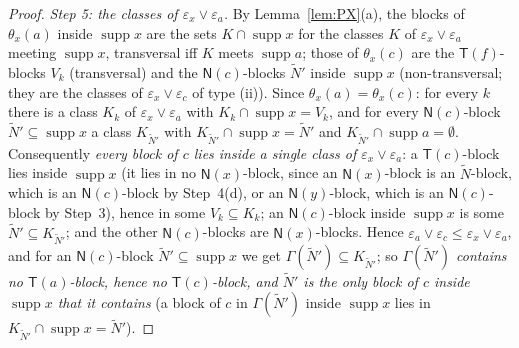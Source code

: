 \documentclass[11pt]{amsart}
\theoremstyle{definition}
\newcommand{\supp}{\operatorname{supp}}
\newcommand{\T}{\mathsf{T}}
\newcommand{\N}{\mathsf{N}}
\begin{document}
\begin{proof}
\emph{Step 5: the classes of $\varepsilon_x\vee\varepsilon_a$.} By Lemma~\ref{lem:PX}(a), the blocks of $\theta_x(a)$ inside $\supp x$ are the sets $K\cap\supp x$ for the classes $K$ of $\varepsilon_x\vee\varepsilon_a$ meeting $\supp x$, transversal iff $K$ meets $\supp a$; those of $\theta_x(c)$ are the $\T(f)$-blocks $V_k$ (transversal) and the $\N(c)$-blocks $\tilde N'$ inside $\supp x$ (non-transversal; they are the classes of $\varepsilon_x\vee\varepsilon_c$ of type (ii)). Since $\theta_x(a)=\theta_x(c)$: for every $k$ there is a class $K_k$ of $\varepsilon_x\vee\varepsilon_a$ with $K_k\cap\supp x=V_k$, and for every $\N(c)$-block $\tilde N'\subseteq\supp x$ a class $K_{\tilde N'}$ with $K_{\tilde N'}\cap\supp x=\tilde N'$ and $K_{\tilde N'}\cap\supp a=\emptyset$. Consequently \emph{every block of $c$ lies inside a single class of $\varepsilon_x\vee\varepsilon_a$}: a $\T(c)$-block lies inside $\supp x$ (it lies in no $\N(x)$-block, since an $\N(x)$-block is an $\tilde N$-block, which is an $\N(c)$-block by Step~4(d), or an $\N(y)$-block, which is an $\N(c)$-block by Step~3), hence in some $V_k\subseteq K_k$; an $\N(c)$-block inside $\supp x$ is some $\tilde N'\subseteq K_{\tilde N'}$; and the other $\N(c)$-blocks are $\N(x)$-blocks. Hence $\varepsilon_a\vee\varepsilon_c\le\varepsilon_x\vee\varepsilon_a$, and for an $\N(c)$-block $\tilde N'\subseteq\supp x$ we get $\Gamma(\tilde N')\subseteq K_{\tilde N'}$; so \emph{$\Gamma(\tilde N')$ contains no $\T(a)$-block, hence no $\T(c)$-block, and $\tilde N'$ is the only block of $c$ inside $\supp x$ that it contains} (a block of $c$ in $\Gamma(\tilde N')$ inside $\supp x$ lies in $K_{\tilde N'}\cap\supp x=\tilde N'$).


\end{proof}
\end{document}
